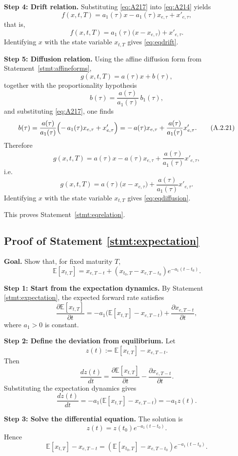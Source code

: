 \documentclass[12pt]{article}
\theoremstyle{statementstyle}
\begin{document}
\begin{appendices}
\medskip
\noindent\textbf{Step 4: Drift relation.}  
Substituting \eqref{eq:A217} into \eqref{eq:A214} yields
\[
f(x,t,T)
=
a_1(\tau)x-a_1(\tau)x_{e,\tau}+x'_{e,\tau},
\]
that is,
\[
f(x,t,T)
=
a_1(\tau)\bigl(x-x_{e,\tau}\bigr)+x'_{e,\tau}.
\tag{A.2.18}
\]
Identifying \(x\) with the state variable \(x_{t,T}\) gives
\eqref{eq:eqdrift}.

\medskip
\noindent\textbf{Step 5: Diffusion relation.}  
Using the affine diffusion form from Statement~\ref{stmt:affineforms},
\[
g(x,t,T)=a(\tau)x+b(\tau),
\tag{A.2.19}
\]
together with the proportionality hypothesis
\[
b(\tau)=\frac{a(\tau)}{a_1(\tau)}\,b_1(\tau),
\tag{A.2.20}
\]
and substituting \eqref{eq:A217}, one finds
\[
b(\tau)
=
\frac{a(\tau)}{a_1(\tau)}
\Bigl(-\,a_1(\tau)x_{e,\tau}+x'_{e,\tau}\Bigr)
=
-\,a(\tau)x_{e,\tau}+\frac{a(\tau)}{a_1(\tau)}x'_{e,\tau}.
\tag{A.2.21}
\]
Therefore
\[
g(x,t,T)
=
a(\tau)x-a(\tau)x_{e,\tau}+\frac{a(\tau)}{a_1(\tau)}x'_{e,\tau},
\]
i.e.
\[
g(x,t,T)
=
a(\tau)\bigl(x-x_{e,\tau}\bigr)
+
\frac{a(\tau)}{a_1(\tau)}x'_{e,\tau}.
\tag{A.2.22}
\]
Identifying \(x\) with the state variable \(x_{t,T}\) gives
\eqref{eq:eqdiffusion}.

\medskip
This proves Statement~\ref{stmt:eqrelation}.
\subsection{Proof of Statement \ref{stmt:expectation}}
\label{appendix:A3}

\textbf{Goal.}
Show that, for fixed maturity \(T\),
\[
\mathbb{E}[x_{t,T}]
=
x_{e,T-t}
+
\left(x_{t_0,T}-x_{e,T-t_0}\right)e^{-a_1(t-t_0)}.
\]

\medskip
\noindent\textbf{Step 1: Start from the expectation dynamics.}
By Statement \ref{stmt:expectation}, the expected forward rate satisfies
\[
\frac{\partial \mathbb{E}[x_{t,T}]}{\partial t}
=
-a_1\bigl(\mathbb{E}[x_{t,T}] - x_{e,T-t}\bigr)
+
\frac{\partial x_{e,T-t}}{\partial t},
\]
where \(a_1>0\) is constant.

\medskip
\noindent\textbf{Step 2: Define the deviation from equilibrium.}
Let
\[
z(t):=\mathbb{E}[x_{t,T}] - x_{e,T-t}.
\]
Then
\[
\frac{dz(t)}{dt}
=
\frac{\partial \mathbb{E}[x_{t,T}]}{\partial t}
-
\frac{\partial x_{e,T-t}}{\partial t}.
\]
Substituting the expectation dynamics gives
\[
\frac{dz(t)}{dt}
=
-a_1\bigl(\mathbb{E}[x_{t,T}] - x_{e,T-t}\bigr)
=
-a_1 z(t).
\]

\medskip
\noindent\textbf{Step 3: Solve the differential equation.}
The solution is
\[
z(t)=z(t_0)e^{-a_1(t-t_0)}.
\]
Hence
\[
\mathbb{E}[x_{t,T}] - x_{e,T-t}
=
\left(\mathbb{E}[x_{t_0,T}] - x_{e,T-t_0}\right)e^{-a_1(t-t_0)}.
\]


\end{appendices}
\end{document}
